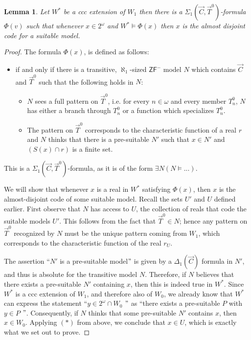 \documentclass[a4paper,11pt]{article}
\newtheorem{lemma}[theorem]{Lemma}
\newcommand{\ZFP}{\mathsf{ZF}^-}
\begin{document}
\begin{lemma}\label{sigma_1 set of suitable models}
 Let $W^{\ast}$ be a ccc extension of $W_1$ then there is a $\Sigma_1(\vec{C}, \vec{T}^0)$-formula $\Phi(v)$ such that whenever $x \in 2^{\omega}$ and $W^{\ast} \models \Phi(x)$ then $x$ is the almost disjoint code for a suitable model. 
\end{lemma}
\begin{proof}
The formula $\Phi(x)$, is defined as follows:

 \begin{itemize}
 \item[$\Phi(x)$]   if and only if there is a transitive, $\aleph_1$-sized $\ZFP$ model $N$ which contains $\vec{C}$ and $\vec{T}^0$ such that the following holds in $N$:  
   \begin{itemize}
    \item $N$ sees a full pattern on $\vec{T}^0$, i.e. for every $n \in \omega$ and 
   every member $T^0_{n}$, $N$ has either a branch through $T^0_{n}$ 
   or a function which specializes $T^0_{n}$. 
\item  The pattern on $\vec{T}^0$ corresponds to the characteristic function of a real $r$ and $N$ thinks that there is a pre-suitable $N'$ such that $x \in N'$ and $(S(x) \cap r)$ is a finite set.
 \end{itemize}
   \end{itemize}
This is a $\Sigma_1(\vec{C}, \vec{T}^0)$-formula, as it is of the form $\exists N( N\models ...)$. 


We will show that whenever $x$ is a real in \(W^{\ast}\) satisfying \(\Phi(x)\), then \(x\) is the almost-disjoint code of some suitable model. Recall the sets \(U'\) and \(U\) defined earlier. First observe that \(N\) has access to \(U\), the collection of reals that code the suitable models \(U'\). This follows from the fact that \(\vec{T}^0 \in N\); hence any pattern on \(\vec{T}^0\) recognized by \(N\) must be the unique pattern coming from \(W_1\), which corresponds to the characteristic function of the real \(r_U\).

The assertion ``\(N'\) is a pre-suitable model$"$ is given by a \(\Delta_1(\vec{C})\) formula in \(N'\), and thus is absolute for the transitive model \(N\). Therefore, if \(N\) believes that there exists a pre-suitable \(N'\) containing \(x\), then this is indeed true in \(W^{\ast}\). Since \(W^{\ast}\) is a ccc extension of \(W_1\), and therefore also of \(W_0\), we already know that \(W^{\ast}\) can express the statement ``\(y \in 2^\omega \cap W_0\) $"$ as ``there exists a pre-suitable \(P\) with \(y \in P\) $"$. Consequently, if \(N\) thinks that some pre-suitable \(N'\) contains \(x\), then \(x \in W_0\). Applying \((\ast)\) from above, we conclude that \(x \in U\), which is exactly what we set out to prove.

\end{proof}
\end{document}
